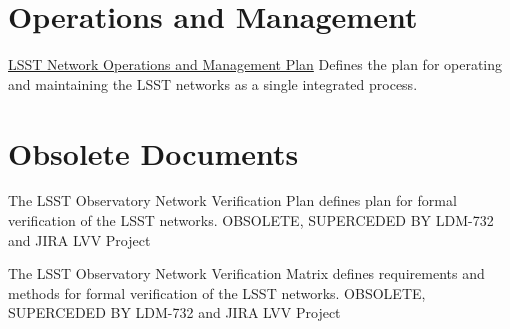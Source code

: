 \section{Operations and Management}

\href{https://confluence.lsstcorp.org/download/attachments/20284335/LSST%20Network%20O%26M%20Plan_v2.docx?version=1&modificationDate=1490879794000&api=v2}{LSST Network Operations and Management Plan}  Defines the plan for operating and maintaining the LSST networks as a single integrated process.

\section{Obsolete Documents}

The LSST Observatory Network Verification Plan defines plan for formal verification of the LSST networks.  OBSOLETE, SUPERCEDED BY LDM-732 and JIRA LVV Project

The LSST Observatory Network Verification Matrix defines requirements and methods for formal verification of the LSST networks. OBSOLETE, SUPERCEDED BY LDM-732 and JIRA LVV Project


